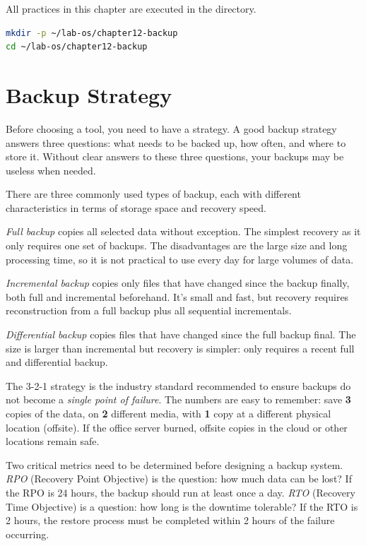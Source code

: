 \begin{notebox}
All practices in this chapter are executed in the  directory.
\begin{lstlisting}[language=bash]
mkdir -p ~/lab-os/chapter12-backup
cd ~/lab-os/chapter12-backup
\end{lstlisting}
\end{notebox}

\section{Backup Strategy}
\label{sec:backup-strategy}

Before choosing a tool, you need to have a strategy. A good backup strategy answers three questions: what needs to be backed up, how often, and where to store it. Without clear answers to these three questions, your backups may be useless when needed.

There are three commonly used types of backup, each with different characteristics in terms of storage space and recovery speed.

\emph{Full backup} copies all selected data without exception.
The simplest recovery as it only requires one set of backups. The disadvantages are the large size and long processing time, so it is not practical to use every day for large volumes of data.

\emph{Incremental backup} copies only files that have changed since the backup
finally, both full and incremental beforehand. It's small and fast, but recovery requires reconstruction from a full backup plus all sequential incrementals.

\emph{Differential backup} copies files that have changed since the full backup
final. The size is larger than incremental but recovery is simpler: only requires a recent full and differential backup.

The 3-2-1 strategy is the industry standard recommended to ensure backups do not become a \emph{single point of failure}. The numbers are easy to remember: save \textbf{3} copies of the data, on \textbf{2} different media, with
\textbf{1} copy at a different physical location (offsite). If the office server
burned, offsite copies in the cloud or other locations remain safe.

Two critical metrics need to be determined before designing a backup system. \emph{RPO} (Recovery Point Objective) is the question: how much data can be lost? If the RPO is 24 hours, the backup should run at least once a day.
\emph{RTO} (Recovery Time Objective) is a question: how long is the downtime
tolerable? If the RTO is 2 hours, the restore process must be completed within 2 hours of the failure occurring.

